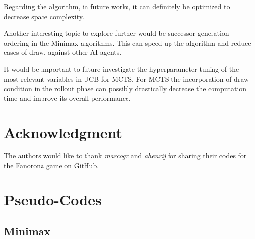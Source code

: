 \documentclass[journal]{IEEEtran}
\begin{document}
Regarding the algorithm, in future works, it can definitely be optimized to decrease space complexity. 

Another interesting topic to explore further would be successor generation ordering in the Minimax algorithms. This can speed up the algorithm and reduce cases of draw, against other AI agents.

It would be important to future investigate the hyperparameter-tuning of the most relevant variables in UCB for MCTS. For MCTS the incorporation of draw condition in the rollout phase can possibly drastically decrease the computation time and improve its overall performance. 

\section*{Acknowledgment}
The authors would like to thank \emph{marcogx} and \emph{ahenrij} for sharing their codes for the Fanorona game on GitHub.

\vfill

\appendices
\section{Pseudo-Codes}
\label{code}
\subsection{Minimax}
\label{codeM}
\end{document}
